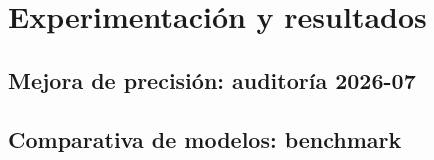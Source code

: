 \chapter{Experimentaci\'on y resultados}
\label{ch:resultados}

\section{Mejora de precisi\'on: auditor\'ia 2026-07}
\label{sec:precision-audit}

\section{Comparativa de modelos: benchmark}
\label{sec:benchmark}

